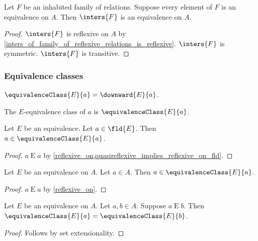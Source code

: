 \begin{proposition}\label{inters_of_family_of_equivalences_on_a_set_is_equivalence_on_that_set}
    Let $F$ be an inhabited family of relations.
    Suppose every element of $F$ is an equivalence on $A$.
    Then $\inters{F}$ is an equivalence on $A$.
\end{proposition}
\begin{proof}
    $\inters{F}$ is reflexive on $A$ by \cref{inters_of_family_of_reflexive_relations_is_reflexive}.
    $\inters{F}$ is symmetric.
    $\inters{F}$ is transitive.
\end{proof}


\subsubsection{Equivalence classes}

\begin{abbreviation}\label{equiv_class}
    $\equivalenceClass{E}{a} = \downward{E}{a}$.
\end{abbreviation}

\begin{abbreviation}\label{equivclass_abbr}
    The $E$-equivalence class of $a$ is $\equivalenceClass{E}{a}$.
\end{abbreviation}

\begin{proposition}\label{equivclasses_inhabited}
    Let $E$ be an equivalence.
    Let $a\in \fld{E}$.
    Then $a\in\equivalenceClass{E}{a}$.
\end{proposition}
\begin{proof}
    $a\mathrel{E} a$ by \cref{reflexive_on,quasireflexive_implies_reflexive_on_fld}.
\end{proof}

\begin{proposition}\label{equivclasses_inhabited_equivalenceon}
    Let $E$ be an equivalence on $A$.
    Let $a\in A$.
    Then $a\in\equivalenceClass{E}{a}$.
\end{proposition}
\begin{proof}
    $a\mathrel{E} a$ by \cref{reflexive_on}.
\end{proof}

\begin{proposition}\label{equiv_implies_equivanlence_classes_eq}
    Let $E$ be an equivalence on $A$.
    Let $a, b\in A$.
    Suppose $a\mathrel{E} b$.
    Then $\equivalenceClass{E}{a} = \equivalenceClass{E}{b}$.
\end{proposition}
\begin{proof}
    Follows by set extensionality.
\end{proof}

